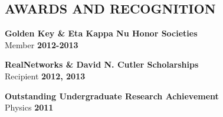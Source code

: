 \documentclass[margin,line]{resume}
\begin{document}
\begin{resume}
\sectionline

    \section{\mysidestyle \textbf{\large{A}\small{WARDS AND RECOGNITION}}}

    \textbf{\listing Golden Key \& Eta Kappa Nu Honor Societies}\\
    Member \hfill \textbf{2012-2013}

    \textbf{\listing RealNetworks \& David N. Cutler Scholarships}\\
    Recipient \hfill \textbf{2012, 2013}

    \textbf{\listing Outstanding Undergraduate Research Achievement}\\
    Physics \hfill \textbf{2011}

\end{resume}
\end{document}
